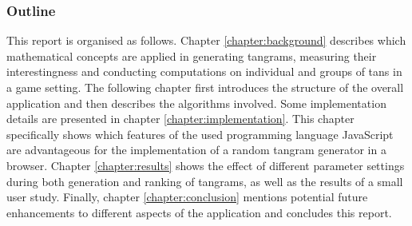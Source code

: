 \subsubsection*{Outline}

This report is organised as follows. Chapter \ref{chapter:background} describes which mathematical concepts are applied in generating tangrams, measuring their interestingness and conducting computations on individual and groups of tans in a game setting. The following chapter first introduces the structure of the overall application and then describes the algorithms involved. Some implementation details are presented in chapter \ref{chapter:implementation}. This chapter specifically shows which features of the used programming language JavaScript are advantageous for the implementation of a random tangram generator in a browser. Chapter \ref{chapter:results} shows the effect of different parameter settings during both generation and ranking of tangrams, as well as the results of a small user study. Finally, chapter \ref{chapter:conclusion} mentions potential future enhancements to different aspects of the application and concludes this report.
